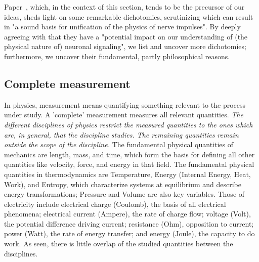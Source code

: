 Paper~\cite{ThermodynamicAPDrukarch:2022}, which, in the context of this section, tends to be the precursor of our ideas, sheds light on some remarkable dichotomies,
scrutinizing which can result in "a sound basis for unification of the physics of nerve impulses".
By deeply agreeing with that they have a "potential impact on our understanding of (the physical nature of) neuronal signaling", we list and uncover more dichotomies; furthermore, we uncover their fundamental,
partly philosophical reasons.





\subsection{Complete measurement\label{sec:Physics-Complete}}

In physics, measurement means quantifying something 
relevant to the process under study.  A 'complete' measurement
measures all relevant quantities. \textit{The different disciplines of physics restrict the measured quantities to the ones which are, in general, that the discipline studies.
The remaining quantities remain outside the scope of the discipline.}
The fundamental physical quantities of mechanics are length, mass, and time, which form the basis for defining all other quantities like velocity, force, and energy in that field.
The fundamental physical quantities in thermodynamics are Temperature, Energy (Internal Energy, Heat, Work), and Entropy, which characterize systems at equilibrium and describe energy transformations; Pressure and Volume are also key variables. 
Those of electricity include electrical charge (Coulomb), the basis of all electrical phenomena; electrical current (Ampere), the rate of charge flow; voltage (Volt), the potential difference driving current; resistance (Ohm), opposition to current; power (Watt), the rate of energy transfer; and energy (Joule), the capacity to do work. 
As seen, there is little overlap of the studied quantities
between the disciplines. 

